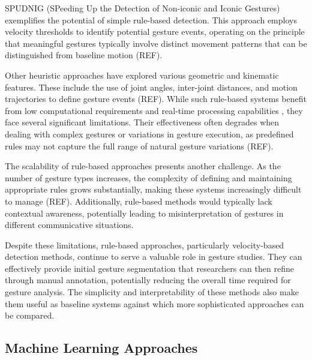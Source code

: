 SPUDNIG (SPeeding Up the Detection of Non-iconic and Iconic Gestures) exemplifies the potential of simple rule-based detection. This approach employs velocity thresholds to identify potential gesture events, operating on the principle that meaningful gestures typically involve distinct movement patterns that can be distinguished from baseline motion (REF). 

Other heuristic approaches have explored various geometric and kinematic features. These include the use of joint angles, inter-joint distances, and motion trajectories to define gesture events (REF). While such rule-based systems benefit from low computational requirements and real-time processing capabilities \citep{molinaGestureRecognition2015}, they face several significant limitations. Their effectiveness often degrades when dealing with complex gestures or variations in gesture execution, as predefined rules may not capture the full range of natural gesture variations (REF).

The scalability of rule-based approaches presents another challenge. As the number of gesture types increases, the complexity of defining and maintaining appropriate rules grows substantially, making these systems increasingly difficult to manage (REF). Additionally, rule-based methods would typically lack contextual awareness, potentially leading to misinterpretation of gestures in different communicative situations.

Despite these limitations, rule-based approaches, particularly velocity-based detection methods, continue to serve a valuable role in gesture studies. They can effectively provide initial gesture segmentation that researchers can then refine through manual annotation, potentially reducing the overall time required for gesture analysis. The simplicity and interpretability of these methods also make them useful as baseline systems against which more sophisticated approaches can be compared.

\subsection{Machine Learning Approaches}\label{subsec:ml}

